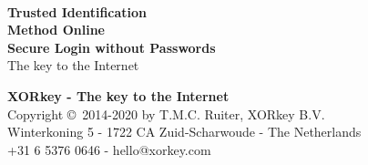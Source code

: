 % 



\raggedbottom
\begin{titlepage}
\begin{center}
\hspace*{2.5cm}
\newline
\dashes
\vspace*{1.0cm}
\sffamily
\Huge
\textbf{\textcolor{darkxor}{\TIMO}}\\
\textbf{\textcolor{darkxor}{Trusted Identification}}\\
\textbf{\textcolor{darkxor}{Method Online}}\\
\vspace{5mm}
\Large
\textbf{\textcolor{darkxor}{Secure Login without Passwords}}\\
\vspace{20mm}
\hspace*{2.7cm}
\newline
\normalsize
\textcolor{darkxor}{The key to the Internet}
\end{center}
\end{titlepage}
\newpage
\thispagestyle{empty}
\vspace*{6.00cm}
\dashes
\begin{center}
\vspace*{-.5em}
\textbf{XORkey - The key to the Internet}\\
\vspace{1em}
\small
Copyright \copyright\ 2014-2020 by T.M.C. Ruiter, XORkey B.V.\\
Winterkoning 5 - 1722 CA Zuid-Scharwoude - The Netherlands\\
+31 6 5376 0646 - hello@xorkey.com 
\normalsize
\end{center}
\newpage
